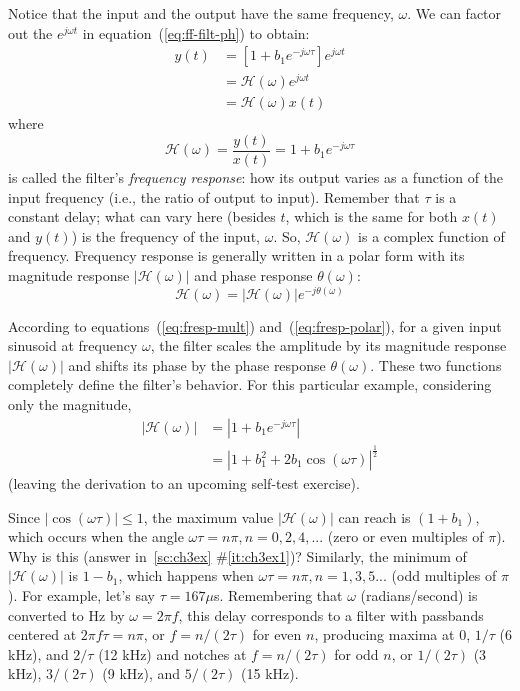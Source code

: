Notice that the input and the output have the same frequency,
$\omega$. We can factor out the $e^{j\omega t}$ in
equation~(\ref{eq:ff-filt-ph}) to obtain:
\begin{align}
y(t) &= [1 + b_1 e^{-j\omega \tau}] e^{j\omega t}\\
&= \mathcal{H}(\omega) e^{j\omega t} \label{eq:fresp-mult} \\
&= \mathcal{H}(\omega) x(t)
\end{align}
where 
\begin{equation}
\mathcal{H}(\omega) = \frac{y(t)}{x(t)} = 1+b_1 e^{-j\omega \tau}
\end{equation}
%
is called the filter's \emph{frequency response}: how its output
varies as a function of the input frequency (i.e., the ratio of output
to input). Remember that $\tau$
is a constant delay; what can vary here (besides $t$, which is the
same for both $x(t)$ and $y(t)$) is the frequency of the input,
$\omega$. So, $\mathcal{H}(\omega)$ is a complex function of frequency.
Frequency response is generally written in a polar form with its
magnitude response $|\mathcal{H}(\omega)|$ and phase response
$\theta(\omega)$:
\begin{equation}
\mathcal{H}(\omega)= |\mathcal{H}(\omega)|e^{-j\theta(\omega)}
\label{eq:fresp-polar}
\end{equation}

According to equations~(\ref{eq:fresp-mult})
and~(\ref{eq:fresp-polar}), for a given input sinusoid at frequency 
$\omega$, the filter scales the amplitude by its
magnitude response $|\mathcal{H}(\omega)|$ and shifts its phase by the
phase response $\theta(\omega)$. These two functions  completely define the
filter's behavior. For this particular example, considering only the
magnitude,
\begin{align}
|\mathcal{H}(\omega)| &= |1+b_1 e^{-j\omega \tau}| \label{eq:ff-mha}\\
           &= |1+b_1^2 + 2b_1 \cos(\omega\tau)|^\frac{1}{2}
\label{eq:ff-mh}
\end{align}
(leaving the derivation to an upcoming self-test exercise).

Since $|\cos(\omega\tau)|\leq 1$, the maximum value
$|\mathcal{H}(\omega)|$ can reach is $(1+b_1)$, which occurs when the
angle $\omega\tau=n\pi, n=0,2,4,...$ (zero or even multiples of
$\pi$). Why is this (answer in~\ref{sc:ch3ex} \#\ref{it:ch3ex1})?
Similarly, the minimum of $|\mathcal{H}(\omega)|$ is $1-b_1$, which
happens when $\omega\tau=n\pi, n=1,3,5...$ (odd multiples of $\pi$).
For example, let's say $\tau=167 \mu$s.  Remembering that $\omega$
(radians/second) is converted to Hz by $\omega=2\pi f$, this delay
corresponds to a filter with passbands centered at $2\pi f \tau =
n\pi$, or $f = n/(2\tau)$ for even $n$, producing maxima at 0,
$1/\tau$ (6 kHz), and $2/\tau$ (12 kHz) and notches at $f = n/(2\tau)$
for odd $n$, or $1/(2\tau)$ (3 kHz), $3/(2\tau)$ (9 kHz), and
$5/(2\tau)$ (15 kHz).


